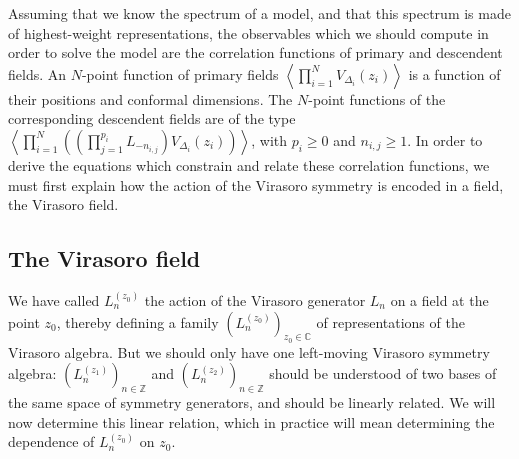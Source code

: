 \documentclass[12pt, a4paper, notitlepage, twoside]{report}
\numberwithin{equation}{section}
\theoremstyle{break}
\begin{document}
Assuming that we know the spectrum of a model, and that this spectrum is made of highest-weight representations, the observables which we should compute in order to solve the model are the correlation functions of primary and descendent fields.
An $N$-point function of primary fields $\left\langle \prod_{i=1}^N V_{\Delta_i}(z_i) \right\rangle$ is a function of their positions and conformal dimensions.
The $N$-point functions of the corresponding descendent fields are of the type $\left\langle \prod_{i=1}^N \left(\left(\prod_{j=1}^{p_i} L_{-n_{i,j}}\right)V_{\Delta_i}(z_i)\right) \right\rangle$, with $p_i\geq 0$ and $n_{i,j}\geq 1$. 
In order to derive the equations which constrain and relate these correlation functions, we must first explain how the action of the Virasoro symmetry is encoded in a field, the Virasoro field.


\subsection{The Virasoro field \label{sectvf}}

We have called $L_n^{(z_0)}$ the action of the Virasoro generator $L_n$ on a field at the point $z_0$, thereby defining a family $(L_n^{(z_0)})_{z_0\in{\mathbb{C}}}$ of representations of the Virasoro algebra.
But we should only have one left-moving Virasoro symmetry algebra: $(L_n^{(z_1)})_{n\in \mathbb{Z}}$ and $(L_n^{(z_2)})_{n\in \mathbb{Z}}$ should be understood of two bases of the same space of symmetry generators, and should be linearly related. 
We will now determine this linear relation, which in practice will mean determining the 
dependence of $L_n^{(z_0)}$ on $z_0$.
\end{document}
